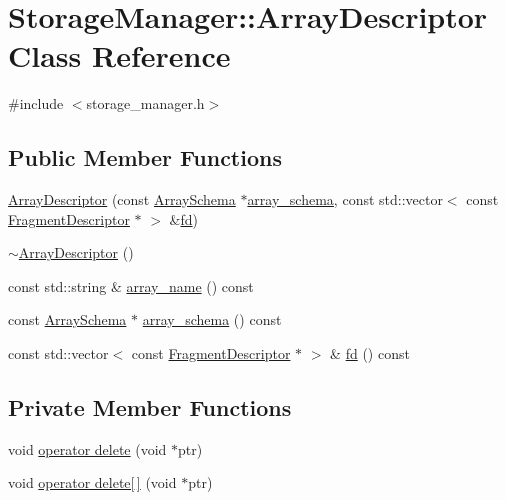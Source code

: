\hypertarget{classStorageManager_1_1ArrayDescriptor}{}\section{Storage\+Manager\+:\+:Array\+Descriptor Class Reference}
\label{classStorageManager_1_1ArrayDescriptor}


{\ttfamily \#include $<$storage\+\_\+manager.\+h$>$}

\subsection*{Public Member Functions}
\begin{DoxyCompactItemize}
\item 
\hyperlink{classStorageManager_1_1ArrayDescriptor_aecb73f50ff75e8bfba047b8350a14a21}{Array\+Descriptor} (const \hyperlink{classArraySchema}{Array\+Schema} $\ast$\hyperlink{classStorageManager_1_1ArrayDescriptor_a5d0168ce3bf2ceb04c394823f1650c11}{array\+\_\+schema}, const std\+::vector$<$ const \hyperlink{classStorageManager_1_1FragmentDescriptor}{Fragment\+Descriptor} $\ast$ $>$ \&\hyperlink{classStorageManager_1_1ArrayDescriptor_a0b471c692ef154544aba0974b77fb5bf}{fd})
\item 
\hyperlink{classStorageManager_1_1ArrayDescriptor_a958fc954e56858223334eb9ad056910d}{$\sim$\+Array\+Descriptor} ()
\item 
const std\+::string \& \hyperlink{classStorageManager_1_1ArrayDescriptor_aca006ab865c58b18fe6c537f31b61c7d}{array\+\_\+name} () const 
\item 
const \hyperlink{classArraySchema}{Array\+Schema} $\ast$ \hyperlink{classStorageManager_1_1ArrayDescriptor_a5d0168ce3bf2ceb04c394823f1650c11}{array\+\_\+schema} () const 
\item 
const std\+::vector$<$ const \hyperlink{classStorageManager_1_1FragmentDescriptor}{Fragment\+Descriptor} $\ast$ $>$ \& \hyperlink{classStorageManager_1_1ArrayDescriptor_a0b471c692ef154544aba0974b77fb5bf}{fd} () const 
\end{DoxyCompactItemize}
\subsection*{Private Member Functions}
\begin{DoxyCompactItemize}
\item 
void \hyperlink{classStorageManager_1_1ArrayDescriptor_ab0fb7224644545385b0b4a7488ff6e60}{operator delete} (void $\ast$ptr)
\item 
void \hyperlink{classStorageManager_1_1ArrayDescriptor_aa5460cfada0255cf5f00d95ff3d012dc}{operator delete\mbox{[}$\,$\mbox{]}} (void $\ast$ptr)
\end{DoxyCompactItemize}
